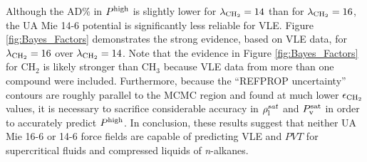 \documentclass[journal=jctc,manuscript=article]{achemso}
\begin{document}

Although the AD\% in $P^{\rm high}$ is slightly lower for $\lambda_{\rm CH_2} = 14$ than for $\lambda_{\rm CH_2} = 16$, the UA Mie 14-6 potential is significantly less reliable for VLE. Figure \ref{fig:Bayes_Factors} demonstrates the strong evidence, based on VLE data, for $\lambda_{\rm CH_2} = 16$ over $\lambda_{\rm CH_2} = 14$. 
Note that the evidence in Figure \ref{fig:Bayes_Factors} for CH$_2$ is likely stronger than CH$_3$ because VLE data from more than one compound were included.
Furthermore, because the ``REFPROP uncertainty'' contours are roughly parallel to the MCMC region and found at much lower $\epsilon_{\rm CH_2}$ values, it is necessary to sacrifice considerable accuracy in $\rho_{\rm l}^{sat}$ and $P_{\rm v}^{\rm sat}$ in order to accurately predict $P^{\rm high}$. 
In conclusion, these results suggest that neither UA Mie 16-6 or 14-6 force fields are capable of predicting VLE and $PVT$ for supercritical fluids and compressed liquids of \textit{n}-alkanes. 




\end{document}
